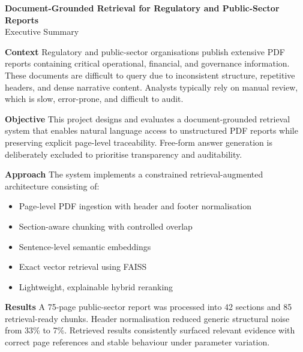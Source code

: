 \documentclass[12pt,a4paper]{article}
\begin{document}
\begin{center}
\vspace*{1cm}

{\LARGE \textbf{Document-Grounded Retrieval for Regulatory and Public-Sector Reports}}\\[0.5cm]

{\large Executive Summary}\\[1cm]

\end{center}

\onehalfspacing

\textbf{Context}  
Regulatory and public-sector organisations publish extensive PDF reports containing critical operational, financial, and governance information. These documents are difficult to query due to inconsistent structure, repetitive headers, and dense narrative content. Analysts typically rely on manual review, which is slow, error-prone, and difficult to audit.

\vspace{0.4cm}

\textbf{Objective}  
This project designs and evaluates a document-grounded retrieval system that enables natural language access to unstructured PDF reports while preserving explicit page-level traceability. Free-form answer generation is deliberately excluded to prioritise transparency and auditability.

\vspace{0.4cm}

\textbf{Approach}  
The system implements a constrained retrieval-augmented architecture consisting of:
\begin{itemize}
\item Page-level PDF ingestion with header and footer normalisation
\item Section-aware chunking with controlled overlap
\item Sentence-level semantic embeddings
\item Exact vector retrieval using FAISS
\item Lightweight, explainable hybrid reranking
\end{itemize}

\vspace{0.4cm}

\textbf{Results}  
A 75-page public-sector report was processed into 42 sections and 85 retrieval-ready chunks. Header normalisation reduced generic structural noise from 33\% to 7\%. Retrieved results consistently surfaced relevant evidence with correct page references and stable behaviour under parameter variation.
\end{document}
